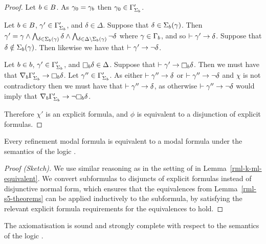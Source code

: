 \begin{proof}
Let $b \in B$.
As $\gamma_0 = \gamma_b$ then $\gamma_0 \in \Gamma'_{\Sigma_b}$.

Let $b \in B$, $\gamma' \in \Gamma'_{\Sigma_b}$, and $\delta \in \Delta$.
Suppose that $\delta \in \Sigma_b(\gamma)$.
Then $\gamma' = \gamma \land \bigwedge_{\delta \in \Sigma_b(\gamma)} \delta \land \bigwedge_{\delta \in \Delta \setminus \Sigma_b(\gamma)} \neg \delta$  where $\gamma \in \Gamma_b$, and so $\vdash \gamma' \rightarrow \delta$.
Suppose that $\delta \notin \Sigma_b(\gamma)$.
Then likewise we have that $\vdash \gamma' \rightarrow \neg \delta$.

Let $b \in b$, $\gamma' \in \Gamma'_{\Sigma_b}$, and $\necessaryB \delta \in \Delta$.
Suppose that $\proves \gamma' \implies \necessaryB \delta$.
Then we must have that $\coversB \Gamma'_{\Sigma_\agentB} \implies \necessaryB \delta$.
Let $\gamma'' \in \Gamma'_{\Sigma_b}$.
As either $\vdash \gamma'' \rightarrow \delta$ or $\vdash \gamma'' \rightarrow \neg \delta$ and $\chi$ is not contradictory then we must have that $\vdash \gamma'' \rightarrow \delta$, as otherwise $\vdash \gamma'' \rightarrow \neg \delta$ would imply that $\coversB \Gamma'_{\Sigma_\agentB} \implies \neg \necessaryB \delta$.

Therefore $\chi'$ is an explicit formula, and $\phi$ is equivalent to a disjunction of explicit formulas.
\end{proof}

\begin{lemma}\label{rml-s5-ml-equivalent}
Every refinement modal formula is equivalent to a modal formula under the semantics of the logic \logicRmlS{}.
\end{lemma}

\begin{proof}[Proof (Sketch)]
We use similar reasoning as in the setting of \logicRmlK{} in Lemma~\ref{rml-k-ml-equivalent}.
We convert subformulas to disjuncts of explicit formulas instead of disjunctive normal form, which ensures that the equivalences from Lemma~\ref{rml-s5-theorems} can be applied inductively to the subformula, by satisfying the relevant explicit formula requirements for the equivalences to hold.
\end{proof}

\begin{theorem}
The axiomatisation \axiomRmlS{} is sound and strongly complete with respect to the semantics of the logic \logicRmlS{}.
\end{theorem}

